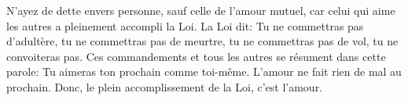 N’ayez de dette envers personne, sauf celle de l’amour mutuel,
	car celui qui aime les autres a pleinement accompli la Loi.
La Loi dit: Tu ne commettras pas d’adultère, tu ne commettras pas de meurtre,
	tu ne commettras pas de vol, tu ne convoiteras pas.
Ces commandements et tous les autres se résument dans cette parole:
	Tu aimeras ton prochain comme toi-même.
L’amour ne fait rien de mal au prochain.
	Donc, le plein accomplissement de la Loi, c’est l’amour.
